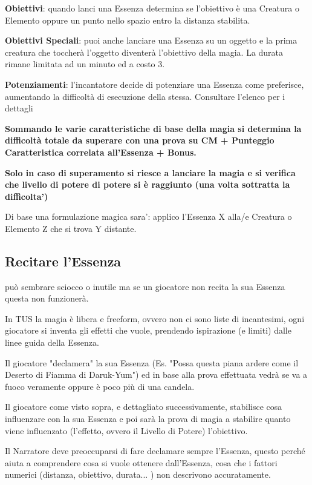 \documentclass[a4paper,11pt,twoside,openany]{book}
\begin{document}
\textbf{Obiettivi}: quando lanci una Essenza determina se l'obiettivo è una Creatura o Elemento oppure un punto nello spazio entro la distanza stabilita.

\textbf{Obiettivi Speciali}: puoi anche lanciare una Essenza su un oggetto e la prima creatura che toccherà l'oggetto diventerà l'obiettivo della magia. La durata rimane limitata ad un minuto ed a costo 3.

\textbf{Potenziamenti}: l'incantatore decide di potenziare una Essenza come preferisce, aumentando la difficoltà di esecuzione della stessa. Consultare l'elenco per i dettagli

\textbf{Sommando le varie caratteristiche di base della magia si determina la difficoltà totale da superare con una prova su CM + Punteggio Caratteristica correlata all'Essenza + Bonus.}

\textbf{Solo in caso di superamento si riesce a lanciare la magia e si verifica che livello di potere di potere si è raggiunto (una volta sottratta la difficolta')}

Di base una formulazione magica sara': applico l'Essenza X alla/e Creatura o Elemento Z che si trova Y distante.

\subsection{Recitare l'Essenza}

\label{recitare-lessenza}

può sembrare sciocco o inutile ma se un giocatore non recita la sua Essenza questa non funzionerà.

In TUS la magia è libera e freeform, ovvero non ci sono liste di incantesimi, ogni giocatore si inventa gli effetti che vuole, prendendo ispirazione (e limiti) dalle linee guida della Essenza.

Il giocatore "declamera" la sua Essenza (Es. "Possa questa piana ardere come il Deserto di Fiamma di Daruk-Yum") ed in base alla prova effettuata vedrà se va a fuoco veramente oppure è poco più di una candela.

Il giocatore come visto sopra, e dettagliato successivamente, stabilisce cosa influenzare con la sua Essenza e poi sarà la prova di magia a stabilire quanto viene influenzato (l'effetto, ovvero il Livello di Potere) l'obiettivo.

Il Narratore deve preoccuparsi di fare declamare sempre l'Essenza, questo perché aiuta a comprendere cosa si vuole ottenere dall'Essenza, cosa che i fattori numerici (distanza, obiettivo, durata... ) non descrivono accuratamente.
\end{document}
